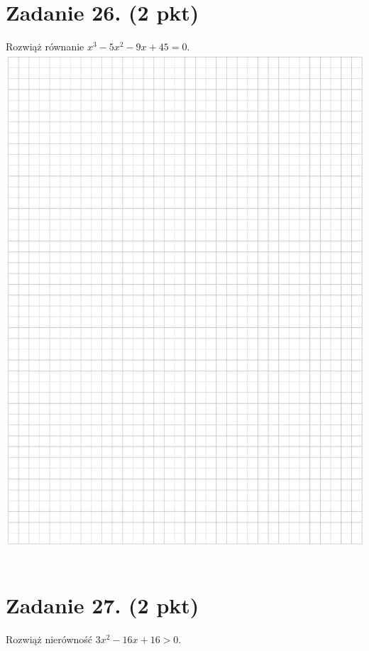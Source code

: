 \documentclass[10pt]{article}
\begin{document}
\section*{Zadanie 26. (2 pkt)}
Rozwiąż równanie \(x^{3}-5 x^{2}-9 x+45=0\).\\
\includegraphics[max width=\textwidth, center]{2024_11_21_d51d653f4fe4a5bb0c33g-14}\\
\(\qquad\)

\section*{Zadanie 27. (2 pkt)}
Rozwiąż nierówność \(3 x^{2}-16 x+16>0\).
\end{document}
